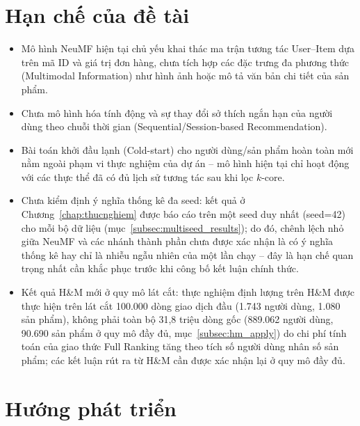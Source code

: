 \section{Hạn chế của đề tài}
\label{sec:hanche}

\begin{itemize}
    \item Mô hình NeuMF hiện tại chủ yếu khai thác ma trận tương tác User--Item dựa trên mã ID và giá trị đơn hàng, chưa tích hợp các đặc trưng đa phương thức (Multimodal Information) như hình ảnh hoặc mô tả văn bản chi tiết của sản phẩm.
    \item Chưa mô hình hóa tính động và sự thay đổi sở thích ngắn hạn của người dùng theo chuỗi thời gian (Sequential/Session-based Recommendation).
    \item Bài toán khởi đầu lạnh (Cold-start) cho người dùng/sản phẩm hoàn toàn mới nằm ngoài phạm vi thực nghiệm của dự án -- mô hình hiện tại chỉ hoạt động với các thực thể đã có đủ lịch sử tương tác sau khi lọc $k$-core.
    \item Chưa kiểm định ý nghĩa thống kê đa seed: kết quả ở Chương~\ref{chap:thucnghiem} được báo cáo trên một seed duy nhất (seed=42) cho mỗi bộ dữ liệu (mục~\ref{subsec:multiseed_results}); do đó, chênh lệch nhỏ giữa NeuMF và các nhánh thành phần chưa được xác nhận là có ý nghĩa thống kê hay chỉ là nhiễu ngẫu nhiên của một lần chạy -- đây là hạn chế quan trọng nhất cần khắc phục trước khi công bố kết luận chính thức.
    \item Kết quả H\&M mới ở quy mô lát cắt: thực nghiệm định lượng trên H\&M được thực hiện trên lát cắt 100.000 dòng giao dịch đầu (1.743 người dùng, 1.080 sản phẩm), không phải toàn bộ 31,8 triệu dòng gốc (889.062 người dùng, 90.690 sản phẩm ở quy mô đầy đủ, mục~\ref{subsec:hm_apply}) do chi phí tính toán của giao thức Full Ranking tăng theo tích số người dùng nhân số sản phẩm; các kết luận rút ra từ H\&M cần được xác nhận lại ở quy mô đầy đủ.
\end{itemize}

\section{Hướng phát triển}
\label{sec:huongphattrien}

